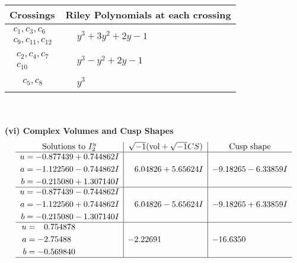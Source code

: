 \documentclass[1p]{elsarticle_modified}
\theoremstyle{definition}
\newcommand{\I}{\sqrt{-1}}
\begin{document}
\begin{tabular}{m{50pt}|m{274pt}}
Crossings & \hspace{64pt}Riley Polynomials at each crossing \\
\hline $$\begin{aligned}c_{1},c_{3},c_{6}\\c_{9},c_{11},c_{12}\end{aligned}$$&$\begin{aligned}
&y^3+3 y^2+2 y-1
\end{aligned}$\\
\hline $$\begin{aligned}c_{2},c_{4},c_{7}\\c_{10}\end{aligned}$$&$\begin{aligned}
&y^3- y^2+2 y-1
\end{aligned}$\\
\hline $$\begin{aligned}c_{5},c_{8}\end{aligned}$$&$\begin{aligned}
&y^3
\end{aligned}$\\
\hline
\end{tabular}\\~\\
\newpage\flushleft \textbf{(vi) Complex Volumes and Cusp Shapes}
$$\begin{array}{c|c|c}  
\text{Solutions to }I^u_{2}& \I (\text{vol} + \sqrt{-1}CS) & \text{Cusp shape}\\
 \hline 
\begin{aligned}
u &= -0.877439 + 0.744862 I \\
a &= -1.122560 - 0.744862 I \\
b &= -0.215080 + 1.307140 I\end{aligned}
 & \phantom{-}6.04826 + 5.65624 I & -9.18265 - 6.33859 I \\ \hline\begin{aligned}
u &= -0.877439 - 0.744862 I \\
a &= -1.122560 + 0.744862 I \\
b &= -0.215080 - 1.307140 I\end{aligned}
 & \phantom{-}6.04826 - 5.65624 I & -9.18265 + 6.33859 I \\ \hline\begin{aligned}
u &= \phantom{-}0.754878\phantom{ +0.000000I} \\
a &= -2.75488\phantom{ +0.000000I} \\
b &= -0.569840\phantom{ +0.000000I}\end{aligned}
 & -2.22691\phantom{ +0.000000I} & -16.6350\phantom{ +0.000000I}\\
 \hline 
 \end{array}$$\newpage\newpage\renewcommand{\arraystretch}{1}
\end{document}
